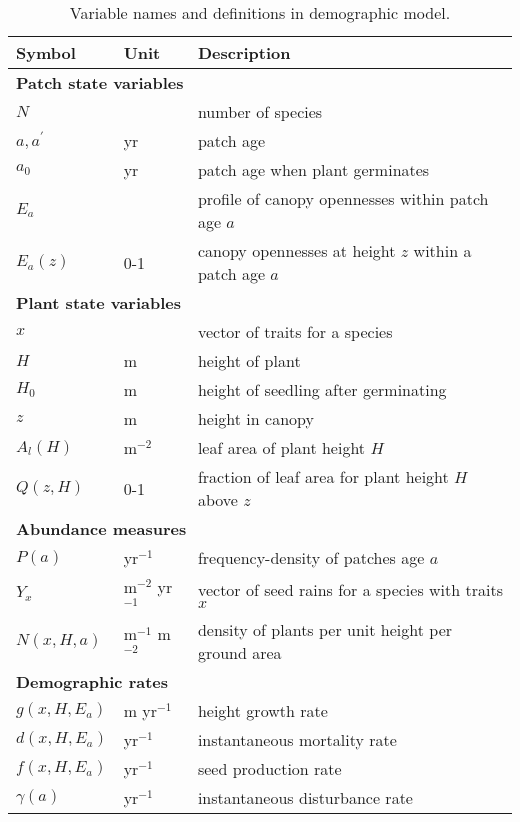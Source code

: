 \documentclass[10pt,twoside]{article}
\begin{document}
\begin{table}[ht]
 \caption{Variable names and definitions in demographic model.}
\centering
  \begin{tabular}{p{2cm}p{2cm}p{9cm}}
  \hline
  Symbol & Unit & Description \\
  \hline
  \multicolumn{3}{l}{\textbf{Patch state variables}} \\
  $N$   & & number of species \\
  $a, a^{\prime}$ & yr & patch age \\
  $a_0$ & yr & patch age when plant germinates \\
  $E_a$ & & profile of canopy opennesses within patch age $a$\\
  $E_a(z)$& 0-1 & canopy opennesses at height $z$ within a patch age $a$\\

  \multicolumn{3}{l}{\textbf{Plant state variables}} \\
  $x$   & & vector of traits for a species\\
  $H$   & m & height of plant\\
  $H_0$   & m  & height of seedling after germinating\\
  $z$   & m & height in canopy\\
  $A_l(H)$  & m$^{-2}$ & leaf area of plant height $H$ \\
  $Q(z, H)$ & 0-1 & fraction of leaf area for plant height $H$ above $z$\\

  \multicolumn{3}{l}{\textbf{Abundance measures}} \\
  $P(a)$ & yr$^{-1}$ & frequency-density of patches age $a$ \\
  $Y_x$ & m$^{-2}$ yr$^{-1}$ & vector of seed rains for a species with traits $x$\\
  $N(x, H, a)$ & m$^{-1}$ m$^{-2}$ & density of plants per unit height per ground area\\

  \multicolumn{3}{l}{\textbf{Demographic rates}} \\
  $g(x, H, E_a)$ & m yr$^{-1}$ & height growth rate \\
  $d(x, H, E_a)$ & yr$^{-1}$ & instantaneous mortality rate \\
  $f(x, H, E_a)$ & yr$^{-1}$ & seed production rate \\
  $\gamma(a)$ & yr$^{-1}$ & instantaneous disturbance rate\\


\end{tabular}
\end{table}
\end{document}
